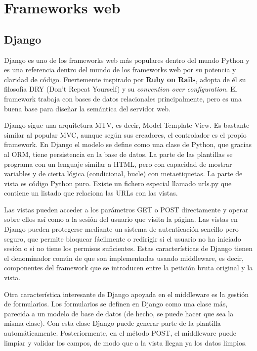 \documentclass[12pt]{report} %
\begin{document}
\section{Frameworks web}

\subsection{Django}
Django es uno de los frameworks web más populares dentro del mundo Python y es una referencia dentro del mundo de los frameworks web por su potencia y claridad de código.\cite{django}
Fuertemente inspirado por \textbf{Ruby on Rails}, adopta de él su filosofía DRY (Don't Repeat Yourself) y su \textit{convention over configuration}.
El framework trabaja con bases de datos relacionales principalmente, pero es una buena base para diseñar la semántica del servidor web.

Django sigue una arquitctura MTV, es decir, Model-Template-View. Es bastante similar al popular MVC, aunque según sus creadores, el controlador es el propio framework.
En Django el modelo se define como una clase de Python, que gracias al ORM, tiene persistencia en la base de datos. La parte de las plantillas se programa con un lenguaje similar a HTML, pero con capacidad de mostrar variables
y de cierta lógica (condicional, bucle) con metaetiquetas. La parte de vista es código Python puro. Existe un fichero especial llamado urls.py que contiene un listado que relaciona las URLs con las vistas.

Las vistas pueden acceder a los parámetros GET o POST directamente y operar sobre ellos así como a la sesión del usuario que visita la página.
Las vistas en Django pueden protegerse mediante un sistema de autenticación sencillo pero seguro, que permite bloquear fácilmente o redirigir si el usuario no ha iniciado sesión o si no tiene los permisos suficientes.
Estas características de Django tienen el denominador común de que son implementadas usando middleware, es decir, componentes del framework que se introducen entre la petición bruta original
y la vista.

Otra característica interesante de Django apoyada en el middleware es la gestión de formularios. Los formularios se definen en Django como una clase más, parecida a un modelo de base de datos (de hecho, se puede hacer que sea la misma clase).
Con esta clase Django puede generar parte de la plantilla automáticamente. Posteriormente, en el método POST, el middleware puede limpiar y validar los campos, de modo que a la vista llegan ya los datos limpios.
\end{document}
